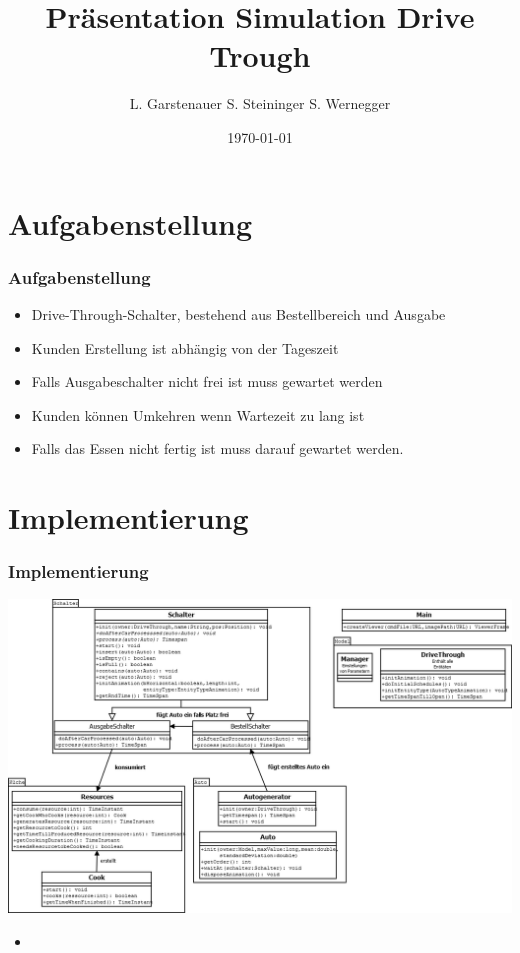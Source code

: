 \documentclass{beamer}
\title{Präsentation Simulation Drive Trough}
\author{L. Garstenauer S. Steininger S. Wernegger}
\date{\today}
\begin{document}
\maketitle
\frame{\tableofcontents[currentsection]}


\section{Aufgabenstellung}
\begin{frame} %
  \frametitle{Aufgabenstellung} %
	\begin{itemize}
		\item Drive-Through-Schalter, bestehend aus Bestellbereich und Ausgabe
		\item Kunden Erstellung ist abhängig von der Tageszeit
		\item Falls Ausgabeschalter nicht frei ist muss gewartet werden
		\item Kunden können Umkehren wenn Wartezeit zu lang ist
		\item Falls das Essen nicht fertig ist muss darauf gewartet werden.
	\end{itemize}
\end{frame}

\section{Implementierung}
\begin{frame}
	 \frametitle{Implementierung } 
	 \includegraphics[width=\textwidth]{SimulationUML.png}
	 \begin{itemize}
	 \item []
	 \end{itemize}
	 
\end {frame}
\end{document}
